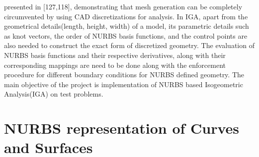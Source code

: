 \documentclass[submit,12pt]{aiaa-pretty} %
\begin{document}
presented in [127,118], demonstrating that mesh generation can be
completely circumvented by using CAD discretizations for analysis.
In IGA, apart from the
geometrical details(length, height, width) of a model, its parametric
details such as knot vectors, the order of NURBS basis functions, and
the control points are also needed to construct the exact form of
discretized geometry. The evaluation of NURBS basis functions and
their respective derivatives, along with their corresponding mappings
are need to be done along with the enforcement procedure for different
boundary conditions for NURBS defined geometry.
The main objective of the project is implementation of NURBS based
Isogeometric Analysis(IGA) on test problems.

\section{NURBS representation of Curves and Surfaces}
\end{document}
